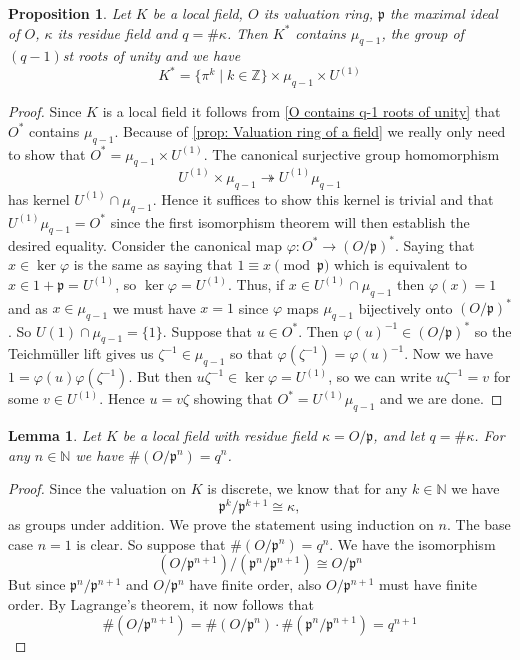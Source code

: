 \documentclass{article}
\newtheorem{proposition}{Proposition}[section]
\newtheorem{lemma}{Lemma}[section]
\newcommand{\mfrak}[1]{\mathfrak{#1}}
\newcommand{\mbb}[1]{\mathbb{#1}}
\numberwithin{equation}{section}
\begin{document}
\begin{proposition}\label{prop: Factorization of elements in K^*}
    Let $K$ be a local field, $O$ its valuation ring, $\mfrak p$ the maximal ideal of $O$, $\kappa$ its residue field and $q = \#\kappa$. Then $K^*$ contains $\mu_{q-1}$, the group of $(q-1)$st roots of unity and we have
    $$K^* = \{\pi^k \mid k \in \mbb Z \} \times \mu_{q-1} \times U^{(1)}$$
\end{proposition}
\begin{proof}
    Since $K$ is a local field it follows from \cref{O contains q-1 roots of unity} that $O^*$ contains $\mu_{q-1}$. Because of \cref{prop: Valuation ring of a field} we really only need to show that $O^* = \mu_{q-1} \times U^{(1)}$. The canonical surjective group homomorphism $$U^{(1)} \times \mu_{q-1} \twoheadrightarrow U^{(1)} \mu_{q-1}$$
    has kernel $U^{(1)} \cap \mu_{q-1} $. Hence it suffices to show this kernel is trivial and that $U^{(1)} \mu_{q-1} = O^*$ since the first isomorphism theorem will then establish the desired equality.  
    Consider the canonical map $\varphi : O^* \to (O / \mfrak p)^*$. Saying that $x \in \ker \varphi$ is the same as saying that $1 \equiv x \pmod{\mfrak p}$ which is equivalent to $x \in 1 + \mfrak p = U^{(1)}$, so $\ker \varphi = U^{(1)}$. Thus, if $x \in U^{(1)} \cap \mu_{q-1}$ then $\varphi(x) = 1$ and as $x \in \mu_{q-1}$ we must have $x = 1$ since $\varphi$ maps $\mu_{q-1}$ bijectively onto $(O/\mfrak p)^*$. So $U{(1)} \cap \mu_{q-1} = \{ 1 \}$. Suppose that $u \in O^*$. Then $\varphi(u)^{-1} \in (O/\mfrak p)^*$ so the Teichmüller lift gives us $\zeta^{-1} \in \mu_{q-1}$ so that $\varphi(\zeta^{-1}) = \varphi(u)^{-1}$. Now we have $1 = \varphi(u)\varphi(\zeta^{-1})$. But then $u\zeta^{-1} \in \ker \varphi = U^{(1)}$, so we can write $u\zeta^{-1} = v$ for some $v \in U^{(1)}$. Hence $u = v \zeta$ showing that $O^* = U^{(1)}\mu_{q-1}$ and we are done.
\end{proof}

\begin{lemma}\label{lem: Valuation ring mod power of prime is finite in local field}
    Let $K$ be a local field with residue field $\kappa = O / \mfrak p$, and let $q = \# \kappa$. For any $n \in \mbb N$ we have $\# (O / \mfrak p^n) = q^n$.
\end{lemma}

\begin{proof}
    Since the valuation on $K$ is discrete, we know that for any $k \in \mbb N$ we have $$\mfrak p^k / \mfrak p^{k+1} \cong \kappa,$$
    as groups under addition. We prove the statement using induction on $n$. The base case $n = 1$ is clear. So suppose that $\# (O / \mfrak p^n) = q^n$. We have the isomorphism
    $$(O / \mfrak p^{n+1}) / (\mfrak p^n / \mfrak p^{n+1}) \cong O / \mfrak p^{n}$$
    But since $\mfrak p^n / \mfrak p^{n+1}$ and $O / \mfrak p^{n}$ have finite order, also $O / \mfrak p^{n+1}$ must have finite order. By Lagrange's theorem, it now follows that $$\# (O / \mfrak p^{n+1}) = \# (O / \mfrak p^{n}) \cdot \# (\mfrak p^n / \mfrak p^{n+1}) = q^{n+1}$$
\end{proof}
\end{document}
